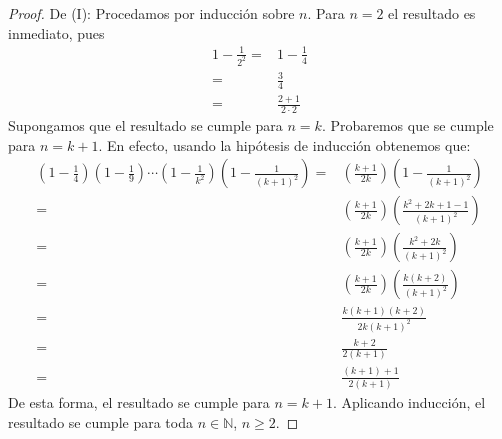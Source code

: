 \documentclass[12pt]{article}
\begin{document}
\begin{enumerate}
\begin{enumerate}
    \end{enumerate}
    \begin{proof}
        De (I): Procedamos por inducción sobre $n$. Para $n=2$ el resultado es inmediato, pues
        \begin{equation*}
            \begin{split}
                1-\frac{1}{2^2}=&1-\frac{1}{4}\\
                =&\frac{3}{4}\\
                =&\frac{2+1}{2\cdot2}
            \end{split}
        \end{equation*}
        Supongamos que el resultado se cumple para $n=k$. Probaremos que se cumple para $n=k+1$. En efecto, usando la hipótesis de inducción obtenemos que:
        \begin{equation*}
            \begin{split}
                \left(1-\frac{1}{4}\right)\left(1-\frac{1}{9}\right)\cdots\left(1-\frac{1}{k^2}\right)\left(1-\frac{1}{(k+1)^2}\right)=&\left(\frac{k+1}{2k}\right)\left(1-\frac{1}{(k+1)^2}\right)\\
                =&\left(\frac{k+1}{2k}\right)\left(\frac{k^2+2k+1-1}{(k+1)^2}\right)\\
                =&\left(\frac{k+1}{2k}\right)\left(\frac{k^2+2k}{(k+1)^2}\right)\\
                =&\left(\frac{k+1}{2k}\right)\left(\frac{k(k+2)}{(k+1)^2}\right)\\
                =&\frac{k(k+1)(k+2)}{2k(k+1)^2}\\
                =&\frac{k+2}{2(k+1)}\\
                =&\frac{(k+1)+1}{2(k+1)}
            \end{split}
        \end{equation*}
        De esta forma, el resultado se cumple para $n=k+1$. Aplicando inducción, el resultado se cumple para toda $n\in\mathbb{N}$, $n\geq2$.


\end{proof}
\end{enumerate}
\end{document}
